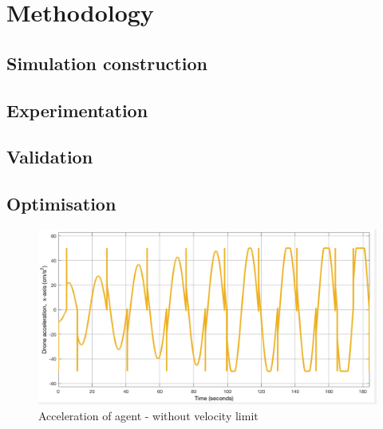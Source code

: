 
\chapter{Methodology}


\section{Simulation construction}

\section{Experimentation}

\section{Validation}

\section{Optimisation}



\begin{figure}[h!]
  \centering
  \includegraphics[width=.8\columnwidth]{figures/SA_accel_with_no_vel_limit.png}
  \caption{Acceleration of agent - without velocity limit}
  \label{fig:sa_accel_no_vel_adj}
\end{figure}






